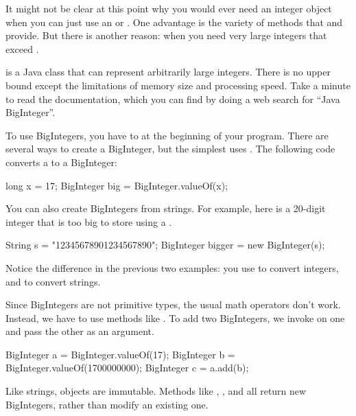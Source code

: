 It might not be clear at this point why you would ever need an integer object when you can just use an  or .
One advantage is the variety of methods that  and  provide.
But there is another reason: when you need very large integers that exceed .


 is a Java class that can represent arbitrarily large integers.
There is no upper bound except the limitations of memory size and processing speed.
Take a minute to read the documentation, which you can find by doing a web search for ``Java BigInteger''.



To use BigIntegers, you have to  at the beginning of your program.
There are several ways to create a BigInteger, but the simplest uses .
The following code converts a  to a BigInteger:

\begin{code}
long x = 17;
BigInteger big = BigInteger.valueOf(x);
\end{code}

You can also create BigIntegers from strings.
For example, here is a 20-digit integer that is too big to store using a .

\begin{code}
String s = "12345678901234567890";
BigInteger bigger = new BigInteger(s);
\end{code}

Notice the difference in the previous two examples: you use  to convert integers, and  to convert strings.

Since BigIntegers are not primitive types, the usual math operators don't work.
Instead, we have to use methods like .
To add two BigIntegers, we invoke  on one and pass the other as an argument.

\begin{code}
BigInteger a = BigInteger.valueOf(17);
BigInteger b = BigInteger.valueOf(1700000000);
BigInteger c = a.add(b);
\end{code}

Like strings,  objects are immutable.
Methods like , , and  all return new BigIntegers, rather than modify an existing one.

